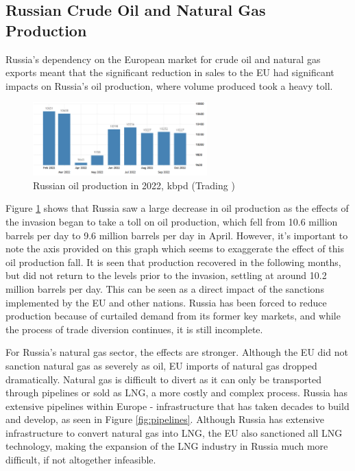 \documentclass[12pt]{article}
\begin{document}
\subsection{Russian Crude Oil and Natural Gas Production}

Russia's dependency on the European market for crude oil and natural gas exports meant that the significant reduction in sales to the EU had significant impacts on Russia's oil production, where volume produced took a heavy toll. 

\begin{figure}[h]
    \centering
    \includegraphics[width=0.6\textwidth]{images/oil prod.png}
    \caption{Russian oil production in 2022, kbpd (Trading \citeauthor{trading_economics})}
    \label{fig:oil prod}
\end{figure}

Figure \ref{fig:oil prod} shows that Russia saw a large decrease in oil production as the effects of the invasion began to take a toll on oil production, which fell from 10.6 million barrels per day to 9.6 million barrels per day in April. However, it's important to note the axis provided on this graph which seems to exaggerate the effect of this oil production fall. It is seen that production recovered in the following months, but did not return to the levels prior to the invasion, settling at around 10.2 million barrels per day. This can be seen as a direct impact of the sanctions implemented by the EU and other nations. Russia has been forced to reduce production because of curtailed demand from its former key markets, and while the process of trade diversion continues, it is still incomplete.  

For Russia's natural gas sector, the effects are stronger. Although the EU did not sanction natural gas as severely as oil, EU imports of natural gas dropped dramatically. Natural gas is difficult to divert as it can only be transported through pipelines or sold as LNG, a more costly and complex process. Russia has extensive pipelines within Europe - infrastructure that has taken decades to build and develop, as seen in Figure \ref{fig:pipelines}. Although Russia has extensive infrastructure to convert natural gas into LNG, the EU also sanctioned all LNG technology, making the expansion of the LNG industry in Russia much more difficult, if not altogether infeasible.
\end{document}
